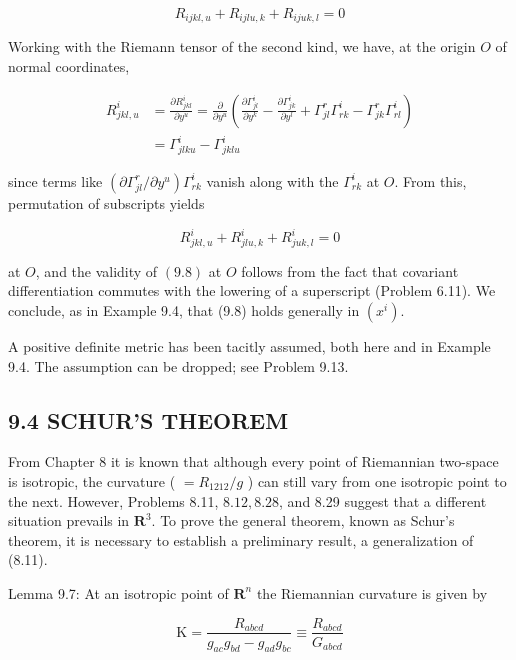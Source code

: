 \documentclass[10pt]{article}
\begin{document}
\begin{equation*}
R_{i j k l, u}+R_{i j l u, k}+R_{i j u k, l}=0 \tag{9.8}
\end{equation*}


Working with the Riemann tensor of the second kind, we have, at the origin $O$ of normal coordinates,

$$
\begin{aligned}
R_{j k l, u}^{i} & =\frac{\partial R_{j k l}^{i}}{\partial y^{u}}=\frac{\partial}{\partial y^{u}}\left(\frac{\partial \Gamma_{j l}^{i}}{\partial y^{k}}-\frac{\partial \Gamma_{j k}^{i}}{\partial y^{l}}+\Gamma_{j l}^{r} \Gamma_{r k}^{i}-\Gamma_{j k}^{r} \Gamma_{r l}^{i}\right) \\
& =\Gamma_{j l k u}^{i}-\Gamma_{j k l u}^{i}
\end{aligned}
$$

since terms like $\left(\partial \Gamma_{j l}^{r} / \partial y^{u}\right) \Gamma_{r k}^{i}$ vanish along with the $\Gamma_{r k}^{i}$ at $O$. From this, permutation of subscripts yields

$$
R_{j k l, u}^{i}+R_{j l u, k}^{i}+R_{j u k, l}^{i}=0
$$

at $O$, and the validity of $(9.8)$ at $O$ follows from the fact that covariant differentiation commutes with the lowering of a superscript (Problem 6.11). We conclude, as in Example 9.4, that (9.8) holds generally in $\left(x^{i}\right)$.

A positive definite metric has been tacitly assumed, both here and in Example 9.4. The assumption can be dropped; see Problem 9.13.

\subsection*{9.4 SCHUR'S THEOREM}
From Chapter 8 it is known that although every point of Riemannian two-space is isotropic, the curvature ( $=R_{1212} / g$ ) can still vary from one isotropic point to the next. However, Problems 8.11, $8.12,8.28$, and 8.29 suggest that a different situation prevails in $\mathbf{R}^{3}$. To prove the general theorem, known as Schur's theorem, it is necessary to establish a preliminary result, a generalization of (8.11).

Lemma 9.7: At an isotropic point of $\mathbf{R}^{n}$ the Riemannian curvature is given by


\begin{equation*}
\mathrm{K}=\frac{R_{a b c d}}{g_{a c} g_{b d}-g_{a d} g_{b c}} \equiv \frac{R_{a b c d}}{G_{a b c d}} \tag{9.9}
\end{equation*}
\end{document}
